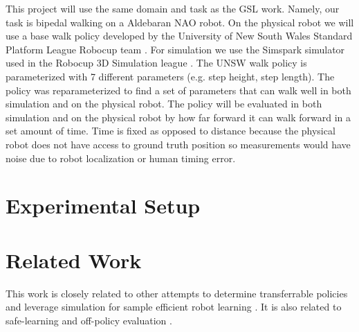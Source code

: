 \documentclass[12 pt]{article}
\begin{document}
This project will use the same domain and task as the GSL work. Namely, our task is bipedal walking on a Aldebaran NAO robot. On the physical robot we will use a base walk policy developed by the University of New South Wales Standard Platform League Robocup team \cite{ashar2014robocup}. For simulation we use the Simspark simulator used in the Robocup 3D Simulation league \cite{simspark}. The UNSW walk policy is parameterized with 7 different parameters (e.g. step height, step length). The policy was reparameterized to find a set of parameters that can walk well in both simulation and on the physical robot. The policy will be evaluated in both simulation and on the physical robot by how far forward it can walk forward in a set amount of time. Time is fixed as opposed to distance because the physical robot does not have access to ground truth position so measurements would have noise due to robot localization or human timing error.

\section{Experimental Setup}



\section{Related Work}

This work is closely related to other attempts to determine transferrable policies and leverage simulation for sample efficient robot learning \cite{koos2010crossing} \cite{cutler2014reinforcement}. It is also related to safe-learning and off-policy evaluation \cite{thomas2015off-policy} \cite{silver2014deterministic}.



\end{document}
